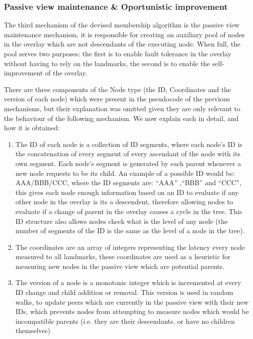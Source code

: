 \subsubsection{Passive view maintenance \& Oportunistic improvement}

The third mechanism of the devised membership algorithm is the passive view maintenance mechanism, it is responsible for creating an auxiliary pool of nodes in the overlay which are not descendants of the executing node. When full, the pool serves two purposes: the first is to enable fault tolerance in the overlay without having to rely on the landmarks, the second is to enable the self-improvement of the overlay. 

There are three components of the Node type (the ID, Coordinates and the version of each node) which were present in the pseudocode of the previous mechanisms, but their explanation was omitted given they are only relevant to the behaviour of the following mechanism. We now explain each in detail, and how it is obtained:

\begin{enumerate}
    \item The ID of each node is a collection of ID segments, where each node's ID is the concatenation of every segment of every ascendant of the node with its own segment. Each node's segment is generated by each parent whenever a new node requests to be its child. An example of a possible ID would be: AAA/BBB/CCC, where the ID segments are: ``AAA'' ,``BBB'' and ``CCC'', this gives each node enough information based on an ID to evaluate if any other node in the overlay is its a descendent, therefore allowing nodes to evaluate if a change of parent in the overlay causes a cycle in the tree. This ID structure also allows nodes check what is the level of any node (the number of segments of the ID is the same as the level of a node in the tree).
    
    \item The coordinates are an array of integers representing the latency every node measured to all landmarks, these coordinates are used as a heuristic for measuring new nodes in the passive view which are potential parents.
    
    \item The version of a node is a monotonic integer which is incremented at every ID change and child addition or removal. This version is used in random walks, to update peers which are currently in the passive view with their new IDs, which prevents nodes from attempting to measure nodes which would be incompatible parents (i.e. they are their descendants, or have no children themselves)
\end{enumerate}


